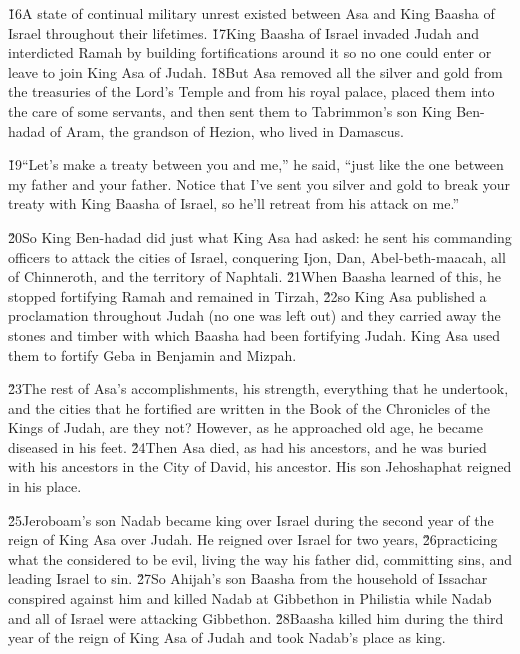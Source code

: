 \v{16}A state of continual military unrest existed between Asa and King Baasha of Israel throughout their lifetimes. \v{17}King Baasha of Israel invaded Judah and interdicted Ramah by building fortifications around it so no one could enter or leave to join King Asa of Judah. \v{18}But Asa removed all the silver and gold from the treasuries of the Lord's Temple and from his royal palace, placed them into the care of some servants, and then sent them to Tabrimmon's son King Ben-hadad of Aram, the grandson of Hezion, who lived in Damascus.

\v{19}``Let's make a treaty between you and me,'' he said, ``just like the one between my father and your father. Notice that I've sent you silver and gold to break your treaty with King Baasha of Israel, so he'll retreat from his attack on me.''

\v{20}So King Ben-hadad did just what King Asa had asked: he sent his commanding officers to attack the cities of Israel, conquering Ijon, Dan, Abel-beth-maacah, all of Chinneroth, and the territory of Naphtali. \v{21}When Baasha learned of this, he stopped fortifying Ramah and remained in Tirzah, \v{22}so King Asa published a proclamation throughout Judah (no one was left out) and they carried away the stones and timber with which Baasha had been fortifying Judah. King Asa used them to fortify Geba in Benjamin and Mizpah.

\v{23}The rest of Asa's accomplishments, his strength, everything that he undertook, and the cities that he fortified are written in the Book of the Chronicles of the Kings of Judah, are they not? However, as he approached old age, he became diseased in his feet. \v{24}Then Asa died, as had his ancestors, and he was buried with his ancestors in the City of David, his ancestor. His son Jehoshaphat reigned in his place.

\v{25}Jeroboam's son Nadab became king over Israel during the second year of the reign of King Asa over Judah. He reigned over Israel for two years, \v{26}practicing what the  considered to be evil, living the way his father did, committing sins, and leading Israel to sin. \v{27}So Ahijah's son Baasha from the household of Issachar conspired against him and killed Nadab at Gibbethon in Philistia while Nadab and all of Israel were attacking Gibbethon. \v{28}Baasha killed him during the third year of the reign of King Asa of Judah and took Nadab's place as king.

